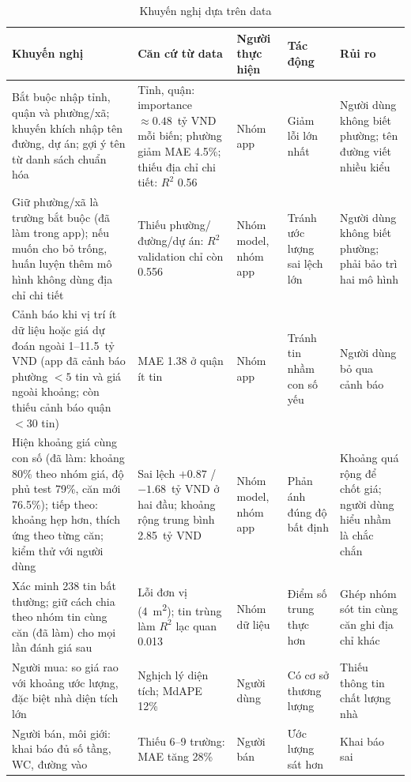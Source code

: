 \documentclass[11pt]{article}
\newcommand{\ty}{tỷ VND}
\newcommand{\mtwo}{m\textsuperscript{2}}
\begin{document}
\begin{table}[H]
\centering
\footnotesize
\caption{Khuyến nghị dựa trên data}
\begin{tabular}{@{}L{0.22\textwidth}L{0.22\textwidth}L{0.14\textwidth}L{0.17\textwidth}L{0.14\textwidth}@{}}
\toprule
\textbf{Khuyến nghị} & \textbf{Căn cứ từ data} & \textbf{Người thực hiện} & \textbf{Tác động} & \textbf{Rủi ro} \\
\midrule
Bắt buộc nhập tỉnh, quận và phường/xã; khuyến khích nhập tên đường, dự án; gợi ý tên từ danh sách chuẩn hóa & Tỉnh, quận: importance $\approx 0.48$~\ty{} mỗi biến; phường giảm MAE 4.5\%; thiếu địa chỉ chi tiết: $R^2$ 0.56 & Nhóm app & Giảm lỗi lớn nhất & Người dùng không biết phường; tên đường viết nhiều kiểu \\
Giữ phường/xã là trường bắt buộc (đã làm trong app); nếu muốn cho bỏ trống, huấn luyện thêm mô hình không dùng địa chỉ chi tiết & Thiếu phường/đường/dự án: $R^2$ validation chỉ còn 0.556 & Nhóm model, nhóm app & Tránh ước lượng sai lệch lớn & Người dùng không biết phường; phải bảo trì hai mô hình \\
Cảnh báo khi vị trí ít dữ liệu hoặc giá dự đoán ngoài 1--11.5~\ty{} (app đã cảnh báo phường $< 5$ tin và giá ngoài khoảng; còn thiếu cảnh báo quận $< 30$ tin) & MAE 1.38 ở quận ít tin & Nhóm app & Tránh tin nhầm con số yếu & Người dùng bỏ qua cảnh báo \\
Hiện khoảng giá cùng con số (đã làm: khoảng 80\% theo nhóm giá, độ phủ test 79\%, căn mới 76.5\%); tiếp theo: khoảng hẹp hơn, thích ứng theo từng căn; kiểm thử với người dùng & Sai lệch $+0.87$ / $-1.68$~\ty{} ở hai đầu; khoảng rộng trung bình 2.85~\ty & Nhóm model, nhóm app & Phản ánh đúng độ bất định & Khoảng quá rộng để chốt giá; người dùng hiểu nhầm là chắc chắn \\
Xác minh 238 tin bất thường; giữ cách chia theo nhóm tin cùng căn (đã làm) cho mọi lần đánh giá sau & Lỗi đơn vị (4~\mtwo); tin trùng làm $R^2$ lạc quan 0.013 & Nhóm dữ liệu & Điểm số trung thực hơn & Ghép nhóm sót tin cùng căn ghi địa chỉ khác \\
Người mua: so giá rao với khoảng ước lượng, đặc biệt nhà diện tích lớn & Nghịch lý diện tích; MdAPE 12\% & Người dùng & Có cơ sở thương lượng & Thiếu thông tin chất lượng nhà \\
Người bán, môi giới: khai báo đủ số tầng, WC, đường vào & Thiếu 6--9 trường: MAE tăng 28\% & Người bán & Ước lượng sát hơn & Khai báo sai \\
\bottomrule
\end{tabular}
\end{table}
\end{document}

